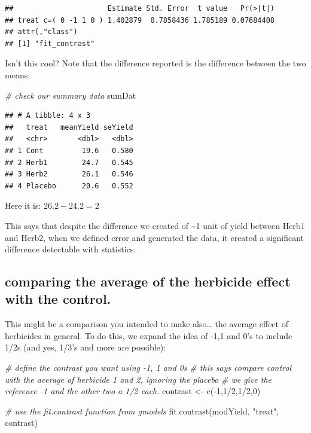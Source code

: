 \documentclass[
]{book}
\newenvironment{Shaded}{\begin{snugshade}}{\end{snugshade}}
\newcommand{\CommentTok}[1]{\textcolor[rgb]{0.56,0.35,0.01}{\textit{#1}}}
\newcommand{\DecValTok}[1]{\textcolor[rgb]{0.00,0.00,0.81}{#1}}
\newcommand{\FunctionTok}[1]{\textcolor[rgb]{0.00,0.00,0.00}{#1}}
\newcommand{\NormalTok}[1]{#1}
\newcommand{\OtherTok}[1]{\textcolor[rgb]{0.56,0.35,0.01}{#1}}
\newcommand{\SpecialCharTok}[1]{\textcolor[rgb]{0.00,0.00,0.00}{#1}}
\newcommand{\StringTok}[1]{\textcolor[rgb]{0.31,0.60,0.02}{#1}}
\begin{document}
\begin{verbatim}
##                      Estimate Std. Error  t value   Pr(>|t|)
## treat c=( 0 -1 1 0 ) 1.402879  0.7858436 1.785189 0.07684408
## attr(,"class")
## [1] "fit_contrast"
\end{verbatim}

Isn't this cool? Note that the difference reported is the difference between the two means:

\begin{Shaded}
\begin{Highlighting}[]
\CommentTok{\# check our summary data}
\NormalTok{sumDat}
\end{Highlighting}
\end{Shaded}

\begin{verbatim}
## # A tibble: 4 x 3
##   treat   meanYield seYield
##   <chr>       <dbl>   <dbl>
## 1 Cont         19.6   0.580
## 2 Herb1        24.7   0.545
## 3 Herb2        26.1   0.546
## 4 Placebo      20.6   0.552
\end{verbatim}

Here it is: \(26.2 - 24.2 = 2\)

This says that despite the difference we created of \textasciitilde1 unit of yield between Herb1 and Herb2, when we defined error and generated the data, it created a significant difference detectable with statistics.

\hypertarget{comparing-the-average-of-the-herbicide-effect-with-the-control.}{%
\subsection{comparing the average of the herbicide effect with the control.}\label{comparing-the-average-of-the-herbicide-effect-with-the-control.}}

This might be a comparison you intended to make also\ldots{} the average effect of herbicides in general. To do this, we expand the idea of -1,1 and 0's to include 1/2s (and yes, 1/3's and more are possible):

\begin{Shaded}
\begin{Highlighting}[]
\CommentTok{\# define the contrast you want using {-}1, 1 and 0\textquotesingle{}s}
\CommentTok{\# this says compare control with the average of herbicide 1 and 2, ignoring the placebo}
\CommentTok{\# we give the reference {-}1 and the \textquotesingle{}other two\textquotesingle{} a 1/2 each.}
\NormalTok{contrast }\OtherTok{\textless{}{-}} \FunctionTok{c}\NormalTok{(}\SpecialCharTok{{-}}\DecValTok{1}\NormalTok{,}\DecValTok{1}\SpecialCharTok{/}\DecValTok{2}\NormalTok{,}\DecValTok{1}\SpecialCharTok{/}\DecValTok{2}\NormalTok{,}\DecValTok{0}\NormalTok{)}

\CommentTok{\# use the fit.contrast function from gmodels}
\FunctionTok{fit.contrast}\NormalTok{(modYield, }\StringTok{"treat"}\NormalTok{, contrast)}
\end{Highlighting}
\end{Shaded}
\end{document}
